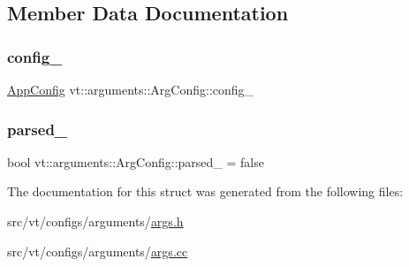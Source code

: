 \subsection{Member Data Documentation}
\mbox{\label{structvt_1_1arguments_1_1_arg_config_af30e0eae1ac1b29f7c85c25636109a9e}} 
\subsubsection{\texorpdfstring{config\+\_\+}{config\_}}
{\footnotesize\ttfamily \hyperlink{structvt_1_1arguments_1_1_app_config}{App\+Config} vt\+::arguments\+::\+Arg\+Config\+::config\+\_\+}

\mbox{\label{structvt_1_1arguments_1_1_arg_config_a710f4894651d38778f924c5d5f340d96}} 
\subsubsection{\texorpdfstring{parsed\+\_\+}{parsed\_}}
{\footnotesize\ttfamily bool vt\+::arguments\+::\+Arg\+Config\+::parsed\+\_\+ = false\hspace{0.3cm}{\ttfamily [private]}}



The documentation for this struct was generated from the following files\+:\begin{DoxyCompactItemize}
\item 
src/vt/configs/arguments/\hyperlink{args_8h}{args.\+h}\item 
src/vt/configs/arguments/\hyperlink{args_8cc}{args.\+cc}\end{DoxyCompactItemize}

